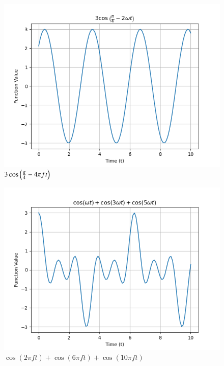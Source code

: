 \documentclass[journal,12pt,onecolumn]{IEEEtran}
\theoremstyle{remark}
\begin{document}
\begin{figure}[h!]
    \centering
    \includegraphics[width=\columnwidth]{figs/a1_fig3.png}
    \caption{$3\cos\left(\frac{\pi}{4}- 4\pi f t\right)$}
    \label{fig:11.14.4.3}
\end{figure}
\begin{figure}[h!]
    \centering
    \includegraphics[width=\columnwidth]{figs/a1_fig4.png}
    \caption{$\cos(2\pi f t)+\cos(6\pi  f t)+\cos(10\pi  f t)$}
    \label{fig:11.14.4.4}
\end{figure}
\end{document}
